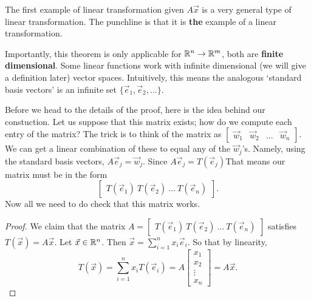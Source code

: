 The first example of linear transformation given $A\vec{x}$ is a very general type of linear transformation.
The punchline is that it is \textbf{the} example of a linear transformation.
\begin{remark}
	Importantly, this theorem is only applicable for $\mathbb{R}^n\to\mathbb{R}^m$, both are \textbf{finite dimensional}.
	Some linear functions work with infinite dimensional (we will give a definition later) vector spaces. Intuitively, this means the analogous
	`standard basis vectors' is an infinite set $\{\vec{e}_1,\vec{e}_2,\ldots\}$. 
\end{remark}
Before we head to the details of the proof, here is the idea behind our constuction.
Let us suppose that this matrix exists; how do we compute each entry of the matrix?
The trick is to think of the matrix as $\begin{bmatrix}
	\vec{w}_1 & \vec{w}_2 & ... & \vec{w}_n
\end{bmatrix}$.
We can get a linear combination of these to equal any of the $\vec{w}_j$'s. Namely, using the standard basis vectors,
$A\vec{e}_j=\vec{w}_j$. Since $A\vec{e}_j=T(\vec{e}_j)$That means our matrix must be in the form \[
	\begin{bmatrix}
		T(\vec{e}_1) \ T(\vec{e}_2) \ \ldots \ T(\vec{e}_n)
	\end{bmatrix} .
\]
Now all we need to do check that this matrix works.
\begin{proof}
	We claim that the matrix $A=\begin{bmatrix}
		T(\vec{e}_1) \ T(\vec{e}_2) \ \ldots \ T(\vec{e}_n)
	\end{bmatrix}$ satisfies $T(\vec{x})=A\vec{x}$.
	Let $\vec{x}\in \mathbb{R}^n$. Then $\vec{x}=\sum_{i=1}^{n} x_i\vec{e}_i$.
	So that by linearity, \[
	T(\vec{x}) = \sum_{i=1}^{n} x_i T(\vec{e}_i) = A \begin{bmatrix}
		x_1 \\ x_2 \\ \vdots \\ x_n
	\end{bmatrix} = A\vec{x}.
	\]
\end{proof}	

